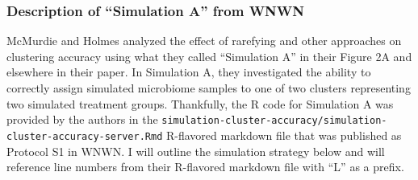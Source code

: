 \documentclass[
]{article}
\begin{document}
\hypertarget{description-of-simulation-a-from-wnwn}{%
\subsubsection{Description of ``Simulation A'' from
WNWN}\label{description-of-simulation-a-from-wnwn}}

McMurdie and Holmes analyzed the effect of rarefying and other
approaches on clustering accuracy using what they called ``Simulation
A'' in their Figure 2A and elsewhere in their paper. In Simulation A,
they investigated the ability to correctly assign simulated microbiome
samples to one of two clusters representing two simulated treatment
groups. Thankfully, the R code for Simulation A was provided by the
authors in the
\texttt{simulation-cluster-accuracy/simulation-cluster-accuracy-server.Rmd}
R-flavored markdown file that was published as Protocol S1 in WNWN. I
will outline the simulation strategy below and will reference line
numbers from their R-flavored markdown file with ``L'' as a prefix.
\end{document}

